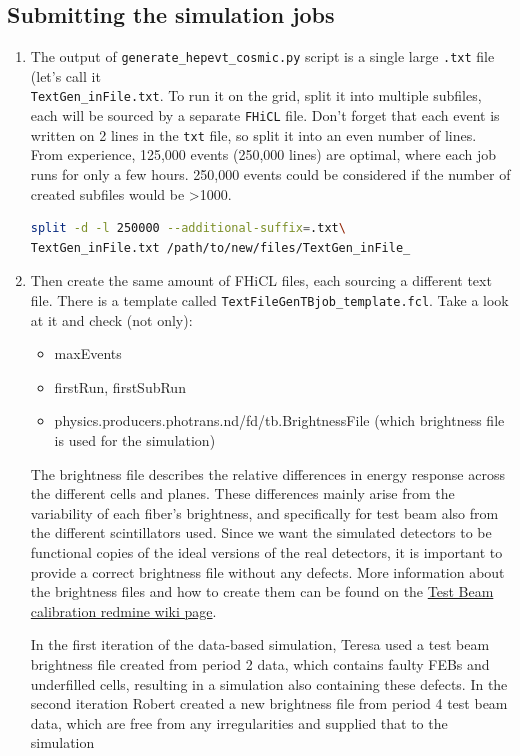 \documentclass[12pt]{article}
\begin{document}
\subsection{Submitting the simulation jobs}\label{secGenerator}
\begin{enumerate}
\item The output of \texttt{generate\_hepevt\_cosmic.py} script is a single large \texttt{.txt} file (let's call it \\ \texttt{TextGen\_inFile.txt}. To run it on the grid, split it into multiple subfiles, each will be sourced by a separate \texttt{FHiCL} file. Don't forget that each event is written on 2 lines in the \texttt{txt} file, so split it into an even number of lines. From experience, 125,000 events (250,000 lines) are optimal, where each job runs for only a few hours. 250,000 events could be considered if the number of created subfiles would be >1000.
\begin{lstlisting}[frame=single,language=bash]
split -d -l 250000 --additional-suffix=.txt\
TextGen_inFile.txt /path/to/new/files/TextGen_inFile_
\end{lstlisting}

\item Then create the same amount of FHiCL files, each sourcing a different text file. There is a template called \texttt{TextFileGenTBjob\_template.fcl}. Take a look at it and check (not only):
\begin{itemize}
\item maxEvents
\item firstRun, firstSubRun
\item physics.producers.photrans.nd/fd/tb.BrightnessFile (which brightness file is used for the simulation)
\end{itemize}

The brightness file describes the relative differences in energy response across the different cells and planes. These differences mainly arise from the variability of each fiber's brightness, and specifically for test beam also from the different scintillators used. Since we want the simulated detectors to be functional copies of the ideal versions of the real detectors, it is important to provide a correct brightness file without any defects. More information about the brightness files and how to create them can be found on the \href{https://cdcvs.fnal.gov/redmine/projects/novaart/wiki/Test\_Beam\_Calibration\_Instructions}{Test Beam calibration redmine wiki page}.

In the first iteration of the data-based simulation, Teresa used a test beam brightness file created from period 2 data, which contains faulty FEBs and underfilled cells, resulting in a simulation also containing these defects. In the second iteration Robert created a new brightness file from period 4 test beam data, which are free from any irregularities and supplied that to the simulation


\end{enumerate}
\end{document}
